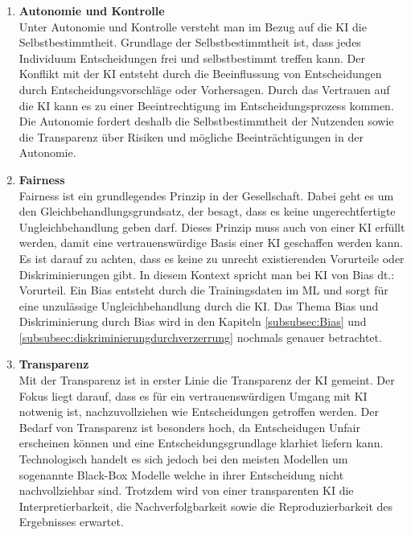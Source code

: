 \begin{onehalfspace}
        \begin{enumerate}
            \item \textbf{Autonomie und Kontrolle} \\
            Unter Autonomie und Kontrolle versteht man im Bezug auf die \ac*{KI} die Selbstbestimmtheit. Grundlage der Selbstbestimmtheit ist, dass jedes Individuum Entscheidungen frei und selbstbestimmt treffen kann. Der Konflikt mit der \ac*{KI} entsteht durch die Beeinflussung von Entscheidungen durch Entscheidungsvorschläge oder Vorhersagen. Durch das Vertrauen auf die \ac*{KI} kann es zu einer Beeintrechtigung im Entscheidungsprozess kommen. Die Autonomie fordert deshalb die Selbstbestimmtheit der Nutzenden sowie die Transparenz über Risiken und mögliche Beeinträchtigungen in der Autonomie.\cite{Cremers2019}\cite{Heesen2020}
            \item \textbf{Fairness} \\
            Fairness ist ein grundlegendes Prinzip in der Gesellschaft. Dabei geht es um den Gleichbehandlungsgrundsatz, der besagt, dass es keine ungerechtfertigte Ungleichbehandlung geben darf. Dieses Prinzip muss auch von einer \ac*{KI} erfüllt werden, damit eine vertrauenswürdige Basis einer \ac*{KI} geschaffen werden kann. Es ist darauf zu achten, dass es keine zu unrecht existierenden Vorurteile oder Diskriminierungen gibt. In diesem Kontext spricht man bei \ac*{KI} von Bias \glqq{}\ac*{dt}.: Vorurteil\grqq{}. Ein Bias entsteht durch die Trainingsdaten im \ac*{ML} und sorgt für eine unzulässige Ungleichbehandlung durch die \ac*{KI}. Das Thema Bias und Diskriminierung durch Bias wird in den Kapiteln \ref*{subsubsec:Bias} und \ref*{subsubsec:diskriminierungdurchverzerrung} nochmals genauer betrachtet.\cite{Cremers2019}\cite{hagendorff2021blind}
            \item \textbf{Transparenz} \\
            Mit der Transparenz ist in erster Linie die Transparenz der \ac*{KI} gemeint. Der Fokus liegt darauf, dass es für ein vertrauenswürdigen Umgang mit \ac*{KI} notwenig ist, nachzuvollziehen wie Entscheidungen getroffen werden. Der Bedarf von Transparenz ist besonders hoch, da Entscheidugen Unfair erscheinen können und eine Entscheidungsgrundlage klarhiet liefern kann. Technologisch handelt es sich jedoch bei den meisten Modellen um sogenannte Black-Box Modelle welche in ihrer Entscheidung nicht nachvollziehbar sind. Trotzdem wird von einer transparenten \ac*{KI} die Interpretierbarkeit, die Nachverfolgbarkeit sowie die Reproduzierbarkeit des Ergebnisses erwartet.\cite{Cremers2019}\cite{Hallensleben2020}\cite{Heesen2020}

\end{enumerate}
\end{onehalfspace}
